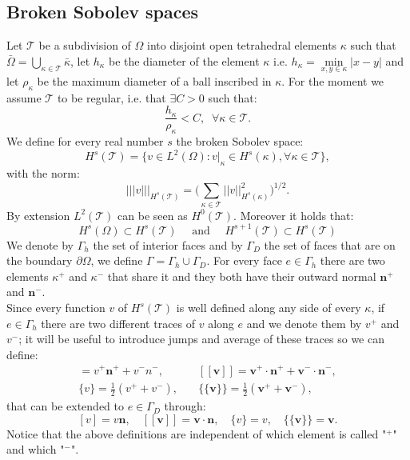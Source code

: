 \documentclass[12pt, a4paper]{article}
\theoremstyle{definition}
\theoremstyle{plain}
\theoremstyle{plain}
\begin{document}
\subsection{Broken Sobolev spaces}
Let $\mathcal{T}$ be a subdivision of $\Omega$ into disjoint open tetrahedral elements $\kappa$ such that $\bar{\Omega} = \bigcup\limits_{\kappa \in \mathcal{T}} \bar{\kappa}$, let $h_\kappa$ be the diameter of the element $\kappa$ i.e. $h_\kappa = \min\limits_{x, y \in \kappa} |x-y|$ and let $\rho_\kappa$ be the maximum diameter of a ball inscribed in $\kappa$. For the moment we assume $\mathcal{T}$ to be regular, i.e. that $\exists C > 0$ such that:
\begin{equation*}
	\frac{h_\kappa}{\rho_\kappa} < C, \; \; \forall \kappa \in \mathcal{T}.
\end{equation*}
We define for every real number $s$ the broken Sobolev space:
\begin{equation*}
	H^s(\mathcal{T}) = \{ v \in L^2(\Omega) : v|_\kappa \in H^s(\kappa), \forall \kappa \in \mathcal{T} \},
\end{equation*}
with the norm:
\begin{equation*}
	|\!|\!|v|\!|\!|_{H^s(\mathcal{T})} = \bigg( \sum_{\kappa \in \mathcal{T}} |\!|v|\!|_{H^s(\kappa)}^2 \bigg)^{1/2}.
\end{equation*}
By extension $L^2(\mathcal{T})$ can be seen as $H^0(\mathcal{T})$. Moreover it holds that:
\begin{equation*}
	H^s(\Omega) \subset H^s(\mathcal{T}) \quad \text{ and } \quad H^{s+1}(\mathcal{T}) \subset H^s(\mathcal{T})
\end{equation*}
We denote by $\Gamma_h$ the set of interior faces and by $\Gamma_D$ the set of faces that are on the boundary $\partial \Omega$, we define $\Gamma = \Gamma_h \cup \Gamma_D$. For every face $e \in \Gamma_h$ there are two elements $\kappa^+$ and $\kappa^-$ that share it and they both have their outward normal $\mathbf{n}^+$ and $\mathbf{n}^-$.\\
Since every function $v$ of $H^s(\mathcal{T})$ is well defined along any side of every $\kappa$, if $e \in \Gamma_h$ there are two different traces of $v$ along $e$ and we denote them by $v^+$ and $v^-$; it will be useful to introduce jumps and average of these traces so we can define:
\begin{align}
	[v] = v^+ \mathbf{n}^+ + v^- {n}^-,
	&\quad [\![ \mathbf{v} ]\!] = \mathbf{v}^+ \cdot \mathbf{n}^+ + \mathbf{v}^- \cdot \mathbf{n}^-, \label{eq:jump} \\
	\{v\} = \frac{1}{2} (v^+ + v^-) ,
	& \quad \{\!\!\{ \mathbf{v} \}\!\!\} = \frac{1}{2} (\mathbf{v}^+ +\mathbf{v}^-), \label{eq:aver}
\end{align}
that can be extended to $e \in \Gamma_D$ through:
\begin{equation} \label{eq:jupsandaverdir}
	[v] = v \mathbf{n},
	\quad [\![ \mathbf{v} ]\!] = \mathbf{v} \cdot \mathbf{n},
	\quad \{v\} = v,
	\quad \{\!\!\{ \mathbf{v} \}\!\!\} = \mathbf{v}.
\end{equation}
Notice that the above definitions are independent of which element is called "$^+$" and which "$^-$".
\end{document}
